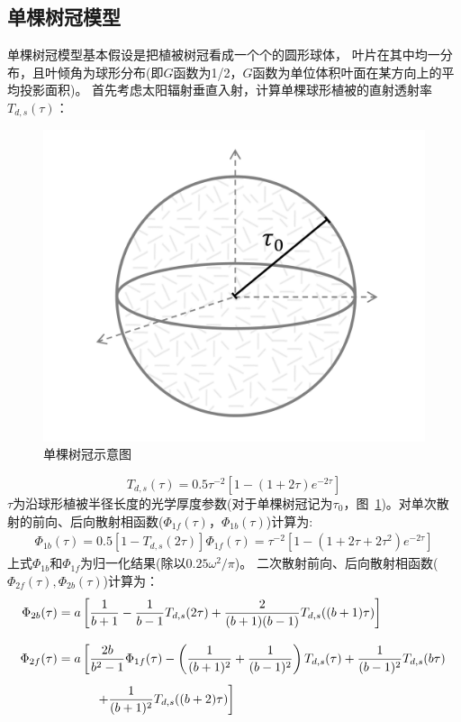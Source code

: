 \subsection{单棵树冠模型}
单棵树冠模型基本假设是把植被树冠看成一个个的圆形球体，
叶片在其中均一分布，且叶倾角为球形分布(即$G$函数为1/2，$G$函数为单位体积叶面在某方向上的平均投影面积)。
首先考虑太阳辐射垂直入射，计算单棵球形植被的直射透射率$T_{d,s}\left(\tau\right)$：
{
\begin{figure}[]
\centering
\includegraphics[width=0.6\columnwidth]{Figures/辐射过程及辐射通量计算/单棵树冠示意图.png}
\caption{单棵树冠示意图}
\label{fig:单棵树冠示意图}
\end{figure}
}
%
\begin{equation}\label{T_ds_tau}
T_{d, s}(\tau)=0.5 \tau^{-2}\left[1-(1+2 \tau) e^{-2 \tau}\right]
\end{equation}
$\tau$为沿球形植被半径长度的光学厚度参数(对于单棵树冠记为$\tau_0$，图~\ref{fig:单棵树冠示意图})。对单次散射的前向、后向散射相函数($\Phi_{1f}\left(\tau\right)$，$\Phi_{1b}\left(\tau\right)$)计算为:
\begin{align}
\Phi_{1 b}(\tau)=0.5\left[1-T_{d, s}(2 \tau)\right]
\Phi_{1 f}(\tau)=\tau^{-2}\left[1-\left(1+2 \tau+2 \tau^{2}\right) e^{-2 \tau}\right]
\end{align}
上式$\Phi_{1b}$和$\Phi_{1f}$为归一化结果(除以$0.25\omega^2/\pi$)。
二次散射前向、后向散射相函数($\Phi_{2f}\left(\tau\right), \Phi_{2b}\left(\tau\right)$)计算为：
\begin{align}
\Phi_{2 b}(\tau) & =a\left[\frac{1}{b+1}-\frac{1}{b-1} T_{d, s}(2 \tau)+\frac{2}{(b+1)(b-1)} T_{d, s}((b+1) \tau)\right] \\[2ex]
%
\Phi_{2 f}(\tau) & =a\left[\frac{2 b}{b^{2}-1} \Phi_{1 f}(\tau)-\left(\frac{1}{(b+1)^{2}}+\frac{1}{(b-1)^{2}}\right) T_{d, s}(\tau)+\frac{1}{(b-1)^{2}} T_{d, s}(b \tau)\right. \notag \\[1ex] 
&\qquad \left.\quad+\frac{1}{(b+1)^{2}} T_{d, s}((b+2) \tau)\right]
\end{align}
